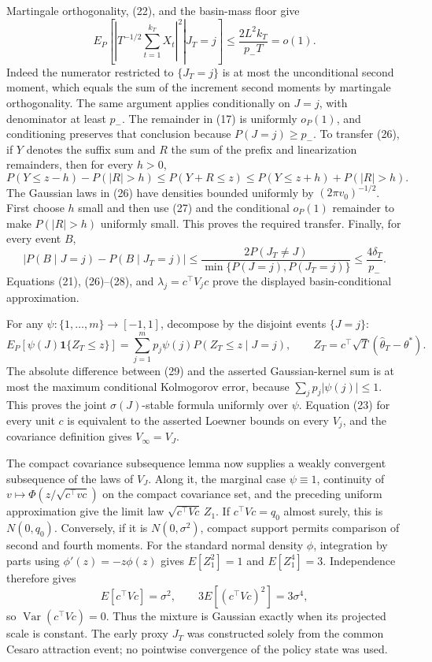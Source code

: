 Martingale orthogonality, (22), and the basin-mass floor give
\[
 E_P\!\left[\left.\left|T^{-1/2}\sum_{t=1}^{k_T}X_t\right|^2\right|J_T=j\right]
 \le \frac{2L^2k_T}{p_-T}=o(1).
\tag{27}
\]
Indeed the numerator restricted to \(\{J_T=j\}\) is at most the unconditional second moment, which equals the sum of the increment second moments by martingale orthogonality. The same argument applies conditionally on \(J=j\), with denominator at least \(p_-\). The remainder in (17) is uniformly \(o_P(1)\), and conditioning preserves that conclusion because \(P(J=j)\ge p_-\). To transfer (26), if \(Y\) denotes the suffix sum and \(R\) the sum of the prefix and linearization remainders, then for every \(h>0\),
\[
 P(Y\le z-h)-P(|R|>h)\le P(Y+R\le z)
 \le P(Y\le z+h)+P(|R|>h).
\]
The Gaussian laws in (26) have densities bounded uniformly by \((2\pi v_0)^{-1/2}\). First choose \(h\) small and then use (27) and the conditional \(o_P(1)\) remainder to make \(P(|R|>h)\) uniformly small. This proves the required transfer. Finally, for every event \(B\),
\[
 \left|P(B\mid J=j)-P(B\mid J_T=j)\right|
 \le \frac{2P(J_T\ne J)}{\min\{P(J=j),P(J_T=j)\}}
 \le\frac{4\delta_T}{p_-}.
\tag{28}
\]
Equations (21), (26)--(28), and \(\lambda_j=c^\top V_jc\) prove the displayed basin-conditional approximation.

For any \(\psi:\{1,\ldots,m\}\to[-1,1]\), decompose by the disjoint events \(\{J=j\}\):
\[
 E_P[\psi(J)\mathbf1\{Z_T\le z\}]
 =\sum_{j=1}^mp_j\psi(j)P(Z_T\le z\mid J=j),
 \qquad Z_T=c^\top\sqrt T(\widehat\theta_T-\theta^*).
\tag{29}
\]
The absolute difference between (29) and the asserted Gaussian-kernel sum is at most the maximum conditional Kolmogorov error, because \(\sum_jp_j|\psi(j)|\le1\). This proves the joint \(\sigma(J)\)-stable formula uniformly over \(\psi\). Equation (23) for every unit \(c\) is equivalent to the asserted Loewner bounds on every \(V_j\), and the covariance definition gives \(V_\infty=V_J\).

The compact covariance subsequence lemma now supplies a weakly convergent subsequence of the laws of \(V_J\). Along it, the marginal case \(\psi\equiv1\), continuity of \(v\mapsto\Phi(z/\sqrt{c^\top vc})\) on the compact covariance set, and the preceding uniform approximation give the limit law \(\sqrt{c^\top Vc}\,Z_1\). If \(c^\top Vc=q_0\) almost surely, this is \(N(0,q_0)\). Conversely, if it is \(N(0,\sigma^2)\), compact support permits comparison of second and fourth moments. For the standard normal density \(\phi\), integration by parts using \(\phi'(z)=-z\phi(z)\) gives \(E[Z_1^2]=1\) and \(E[Z_1^4]=3\). Independence therefore gives
\[
 E[c^\top Vc]=\sigma^2,
 \qquad 3E[(c^\top Vc)^2]=3\sigma^4,
\]
so \(\operatorname{Var}(c^\top Vc)=0\). Thus the mixture is Gaussian exactly when its projected scale is constant. The early proxy \(J_T\) was constructed solely from the common Cesaro attraction event; no pointwise convergence of the policy state was used.